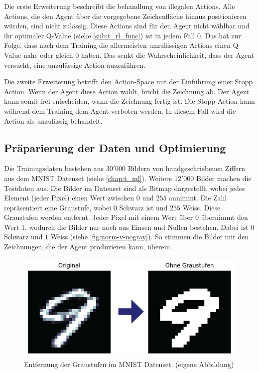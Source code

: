 Die erste Erweiterung beschreibt die behandlung von illegalen Actions. Alle
Actions, die den Agent über die vorgegebene Zeichenfläche hinaus positionieren
würden, sind nicht zulässig. Diese Actions sind für den Agent nicht wählbar
und ihr optimaler Q-Value (siehe \ref{sub:t_rl_func}) ist in jedem Fall
$0$. Das hat zur Folge, dass nach dem Training die allermeisten unzulässigen
Actions einen Q-Value nahe oder gleich $0$ haben. Das senkt die
Wahrscheinlichkeit, dass der Agent versucht, eine unzulässige Action
auszuführen.

Die zweite Erweiterung betrifft den Action-Space mit der Einführung einer Stopp
Action. Wenn der Agent diese Action wählt, bricht die Zeichnung ab. Der Agent
kann somit frei entscheiden, wann die Zeichnung fertig ist. Die Stopp Action
kann während dem Training dem Agent verboten werden. In diesem Fall wird die
Action als unzulässig behandelt.


\subsection{Präparierung der Daten und Optimierung}\label{sub:m_grund_data} Die
Trainingsdaten bestehen aus $30'000$ Bildern von handgeschriebenen Ziffern aus
dem MNIST Datenset (siehe \ref{chap:t_ml}). Weitere $12'000$ Bilder machen
die Testdaten aus. Die Bilder im Datenset sind als Bitmap dargestellt, wobei
jedes Element (jeder Pixel) einen Wert zwischen $0$ und $255$ annimmt. Die Zahl
repräsentiert eine Graustufe, wobei $0$ Schwarz ist und $255$ Weiss. Diese
Graustufen werden entfernt. Jeder Pixel mit einem Wert über $0$ übernimmt den
Wert $1$, wodurch die Bilder nur noch aus Einsen und Nullen bestehen. Dabei ist
$0$ Schwarz und $1$ Weiss (siehe \autoref{fig:norm-v-nogray}). So stimmen die
Bilder mit den Zeichnungen, die der Agent produzieren kann, überein.
 
\begin{figure}[!ht]
 \centering
 \includegraphics[width=\textwidth]{images/methode/norm-v-nogray.png}
 \caption{Entfernung der Graustufen im MNIST Datenset. (eigene Abbildung)}\label{fig:norm-v-nogray}
\end{figure}

